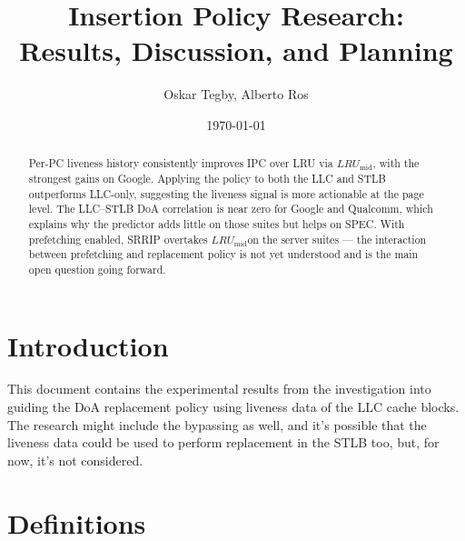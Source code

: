 \documentclass[12pt]{article}
\title{Insertion Policy Research:\\[0.4em]
       \large Results, Discussion, and Planning}
\author{Oskar Tegby, Alberto Ros}
\date{\today}
\newcommand{\lrumid}{$LRU_\text{mid}$}
\begin{document}
\maketitle

\begin{abstract}
Per-PC liveness history consistently improves IPC over LRU via \lrumid,
with the strongest gains on Google. Applying the policy to both the LLC and STLB
outperforms LLC-only, suggesting the liveness signal is more actionable at the page
level. The LLC--STLB DoA correlation is near zero for Google and Qualcomm, which
explains why the predictor adds little on those suites but helps on SPEC. With
prefetching enabled, SRRIP overtakes \lrumid on the server suites ---
the interaction between prefetching and replacement policy is not yet understood
and is the main open question going forward.
\end{abstract}

\tableofcontents

\section{Introduction}
This document contains the experimental results from the investigation into guiding the DoA replacement policy
using liveness data of the LLC cache blocks. The research might include the bypassing as well, and it's possible
that the liveness data could be used to perform replacement in the STLB too, but, for now, it's not considered.

\section{Definitions}
\end{document}
